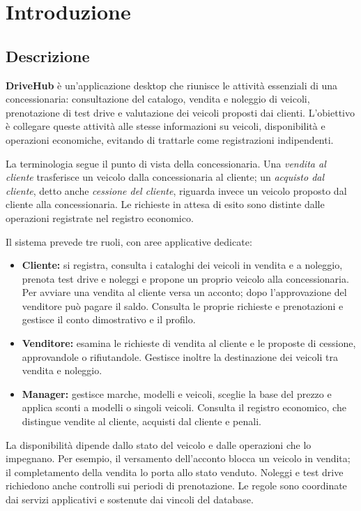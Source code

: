 \chapter{Introduzione}\label{ch:introduzione}

\section{Descrizione}
\textbf{DriveHub} è un'applicazione desktop che riunisce le attività essenziali di una concessionaria: consultazione del catalogo, vendita e noleggio di veicoli, prenotazione di test drive e valutazione dei veicoli proposti dai clienti. L'obiettivo è collegare queste attività alle stesse informazioni su veicoli, disponibilità e operazioni economiche, evitando di trattarle come registrazioni indipendenti.

La terminologia segue il punto di vista della concessionaria. Una \emph{vendita al cliente} trasferisce un veicolo dalla concessionaria al cliente; un \emph{acquisto dal cliente}, detto anche \emph{cessione del cliente}, riguarda invece un veicolo proposto dal cliente alla concessionaria. Le richieste in attesa di esito sono distinte dalle operazioni registrate nel registro economico.

Il sistema prevede tre ruoli, con aree applicative dedicate:
\begin{itemize}
  \item \textbf{Cliente:} si registra, consulta i cataloghi dei veicoli in vendita e a noleggio, prenota test drive e noleggi e propone un proprio veicolo alla concessionaria. Per avviare una vendita al cliente versa un acconto; dopo l'approvazione del venditore può pagare il saldo. Consulta le proprie richieste e prenotazioni e gestisce il conto dimostrativo e il profilo.
  \item \textbf{Venditore:} esamina le richieste di vendita al cliente e le proposte di cessione, approvandole o rifiutandole. Gestisce inoltre la destinazione dei veicoli tra vendita e noleggio.
  \item \textbf{Manager:} gestisce marche, modelli e veicoli, sceglie la base del prezzo e applica sconti a modelli o singoli veicoli. Consulta il registro economico, che distingue vendite al cliente, acquisti dal cliente e penali.
\end{itemize}

La disponibilità dipende dallo stato del veicolo e dalle operazioni che lo impegnano. Per esempio, il versamento dell'acconto blocca un veicolo in vendita; il completamento della vendita lo porta allo stato venduto. Noleggi e test drive richiedono anche controlli sui periodi di prenotazione. Le regole sono coordinate dai servizi applicativi e sostenute dai vincoli del database.

